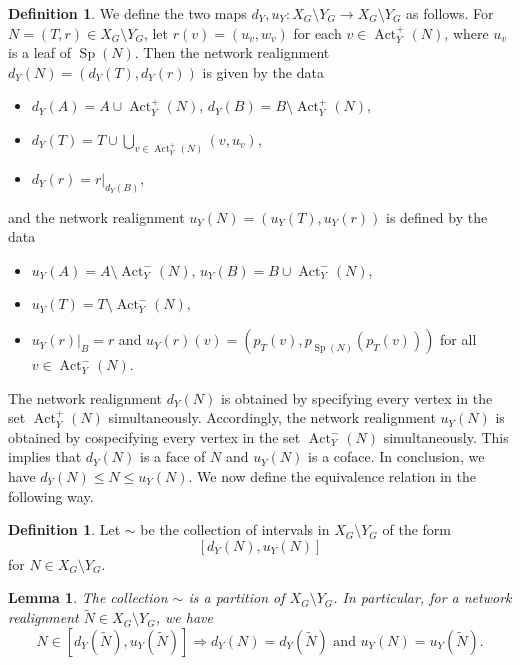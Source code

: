 \documentclass[reqno,dvipsnames]{amsart}
\theoremstyle{plain}
\newtheorem{lemma}[theorem]{Lemma}
\numberwithin{equation}{section}
\theoremstyle{definition}
\newtheorem{definition}[theorem]{Definition}
\DeclareMathOperator{\Act}{Act}
\DeclareMathOperator{\Sp}{Sp}
\begin{document}
\begin{definition}\label{def:interval_limits}
	We define the two maps $d_Y,u_Y\colon X_G\setminus Y_G\rightarrow X_G\setminus Y_G$ as follows. For $N=(T,r)\in X_G\setminus Y_G$, let $r(v)=(u_v,w_v)$ for each $v\in\Act_Y^+(N)$, where $u_v$ is a leaf of $\Sp(N)$. Then the network realignment $d_Y(N)=(d_Y(T),d_Y(r))$ is given by the data
	\begin{itemize}
		\item $d_Y(A)=A\cup \Act_Y^+(N)$, \> $d_Y(B)=B\setminus \Act_Y^+(N)$,
		\item $d_Y(T)=T\cup \bigcup\limits_{v\in \Act_Y^+(N)} (v,u_v)$,
		\item $d_Y(r) = r\vert_{d_Y(B)}$,
	\end{itemize}
	and the network realignment $u_Y(N)=(u_Y(T),u_Y(r))$ is defined by the data	
	\begin{itemize}
		\item $u_Y(A)=A\setminus \Act_Y^-(N)$, \> $u_Y(B) = B\cup \Act_Y^-(N)$,
		\item $u_Y(T) = T \setminus \Act_Y^-(N)$,
		\item  $u_Y(r)\vert_{B}=r$ and $u_Y(r)(v)=(p_T(v),p_{\Sp(N)}(p_T(v)))$ for all $v\in \Act_Y^-(N)$.
	\end{itemize}
\end{definition}

The network realignment $d_Y(N)$ is obtained by specifying every vertex in the set $\Act_Y^+(N)$ simultaneously. Accordingly, the network realignment $u_Y(N)$ is obtained by cospecifying every vertex in the set $\Act_Y^-(N)$ simultaneously. This implies that $d_Y(N)$ is a face of $N$ and $u_Y(N)$ is a coface. In conclusion, we have $d_Y(N)\leq N\leq u_Y(N)$. We now define the equivalence relation in the following way.

\begin{definition}
	Let $\sim$ be the collection of intervals in $X_G\setminus Y_G$ of the form
	\[
	[d_Y(N),u_Y(N)]
	\]
	for $N\in X_G\setminus Y_G$.
\end{definition}

\begin{lemma}\label{lem:firstMatchingWellDef}
	The collection $\sim$ is a partition of $X_G\setminus Y_G$. In particular, for a network realignment $\tilde{N}\in X_G\setminus Y_G$, we have
	\begin{equation}\label{Eq:NInInterv}
		N\in [d_Y(\tilde{N}),u_Y(\tilde{N})] \Rightarrow d_Y(N)=d_Y(\tilde{N}) \text{ and } u_Y(N)=u_Y(\tilde{N}).
	\end{equation}
\end{lemma}
\end{document}
